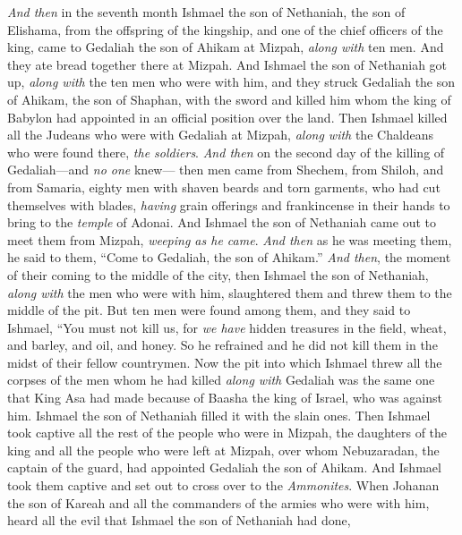 \begin{biblechapter} %
\verse \textit{And then} in the seventh month Ishmael the son of Nethaniah, the son of Elishama, from the offspring of the kingship, and one of the chief officers of the king, came to Gedaliah the son of Ahikam at Mizpah, \textit{along with} ten men. And they ate bread together there at Mizpah.
\verse And Ishmael the son of Nethaniah got up, \textit{along with} the ten men who were with him, and they struck Gedaliah the son of Ahikam, the son of Shaphan, with the sword and killed him whom the king of Babylon had appointed in an official position over the land.
\verse Then Ishmael killed all the Judeans who were with Gedaliah at Mizpah, \textit{along with} the Chaldeans who were found there, \textit{the soldiers}.
 \textit{And then} on the second day of the killing of Gedaliah—and \textit{no one} knew—
\verse then men came from Shechem, from Shiloh, and from Samaria, eighty men with shaven beards and torn garments, who had cut themselves with blades, \textit{having} grain offerings and frankincense in their hands to bring to the \textit{temple} of Adonai.
\verse And Ishmael the son of Nethaniah came out to meet them from Mizpah, \textit{weeping as he came}. \textit{And then} as he was meeting them, he said to them, “Come to Gedaliah, the son of Ahikam.”
\verse \textit{And then}, the moment of their coming to the middle of the city, then Ishmael the son of Nethaniah, \textit{along with} the men who were with him, slaughtered them and threw them to the middle of the pit.
\verse But ten men were found among them, and they said to Ishmael, “You must not kill us, for \textit{we have} hidden treasures in the field, wheat, and barley, and oil, and honey. So he refrained and he did not kill them in the midst of their fellow countrymen.
\verse Now the pit into which Ishmael threw all the corpses of the men whom he had killed \textit{along with} Gedaliah was the same one that King Asa had made because of Baasha the king of Israel, who was against him. Ishmael the son of Nethaniah filled it with the slain ones.
\verse Then Ishmael took captive all the rest of the people who were in Mizpah, the daughters of the king and all the people who were left at Mizpah, over whom Nebuzaradan, the captain of the guard, had appointed Gedaliah the son of Ahikam. And Ishmael took them captive and set out to cross over to the \textit{Ammonites}.
\verse When Johanan the son of Kareah and all the commanders of the armies who were with him, heard all the evil that Ishmael the son of Nethaniah had done,

\end{biblechapter}
